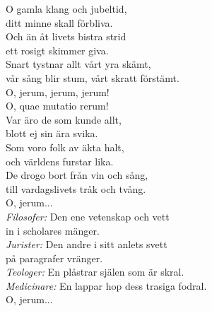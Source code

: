 \documentclass[a6paper,10pt]{article}
\begin{document}
\setlength{\oddsidemargin}{-0.37in}
\noindent
\vspace{20pt} 
\begin{center}
\end{center}
\begin{lyrics}
O gamla klang och jubeltid,\\
ditt minne skall förbliva.\\
Och än åt livets bistra strid\\
ett rosigt skimmer giva.\\
Snart tystnar allt vårt yra skämt,\\
vår sång blir stum, vårt skratt förstämt.\\
O, jerum, jerum, jerum!\\
O, quae mutatio rerum!
\vspace{5pt}\\
Var äro de som kunde allt,\\
blott ej sin ära svika.\\
Som voro folk av äkta halt,\\
och världens furstar lika.\\
De drogo bort från vin och sång,\\
till vardagslivets tråk och tvång.\\
O, jerum...
\vspace{5pt}\\
\textit{Filosofer:} Den ene vetenskap och vett\\
in i scholares mänger.\\
\textit{Jurister:} Den andre i sitt anlets svett\\
på paragrafer vränger.\\
\textit{Teologer:} En plåstrar själen som är skral.\\
\textit{Medicinare:} En lappar hop dess trasiga fodral.\\
O, jerum...


\end{lyrics}
\end{document}
